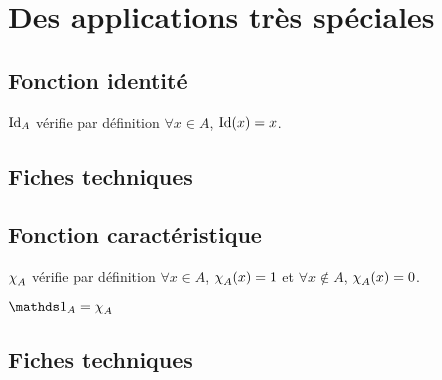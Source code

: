 \documentclass[12pt,a4paper]{article}
\begin{document}
\section{Des applications très spéciales}

\subsection{Fonction identité}

\begin{latexex}
$\operatorname*{\operatorname{Id}}_A$ vérifie par définition
$\forall x \in A$, $\operatorname*{\operatorname{Id}}(x) = x$.
\end{latexex}




\subsection{Fiches techniques}





\subsection{Fonction caractéristique}


\begin{latexex}
$\operatorname{\chi}_A$ vérifie par définition
$\forall x \in A$, $\operatorname{\chi}_A(x) = 1$ et
$\forall x \notin A$, $\operatorname{\chi}_A(x) = 0$.
\end{latexex}





\begin{latexex}
$\caractone_A = \caract_A$
\end{latexex}




\subsection{Fiches techniques}


    
\end{document}
